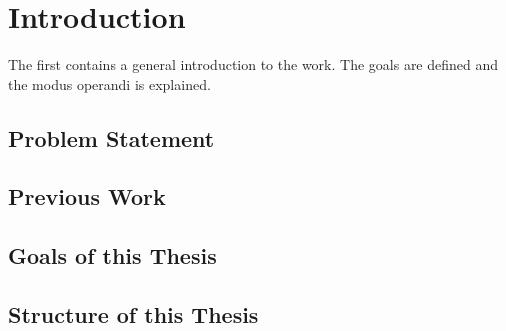 \chapter{Introduction}
\label{cha:intro}
The first contains a general introduction to the work. The goals are
defined and the modus operandi is explained.

\section{Problem Statement}
\lipsum[6-7]

\section{Previous Work}
\lipsum[6-7]

\section{Goals of this Thesis}
\lipsum[4-5]

\section{Structure of this Thesis}
\lipsum[6-7]

